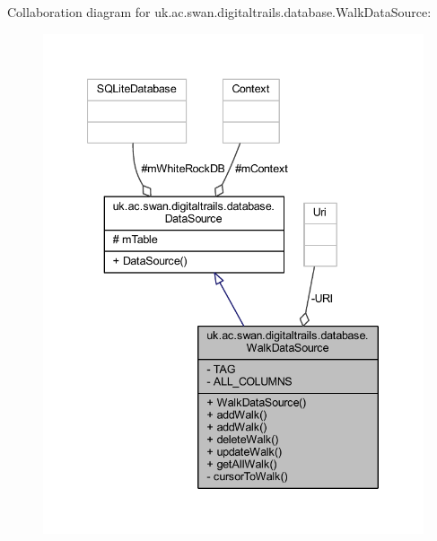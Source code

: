 Collaboration diagram for uk.\+ac.\+swan.\+digitaltrails.\+database.\+Walk\+Data\+Source\+:
\nopagebreak
\begin{figure}[H]
\begin{center}
\leavevmode
\includegraphics[width=340pt]{classuk_1_1ac_1_1swan_1_1digitaltrails_1_1database_1_1_walk_data_source__coll__graph}
\end{center}
\end{figure}
